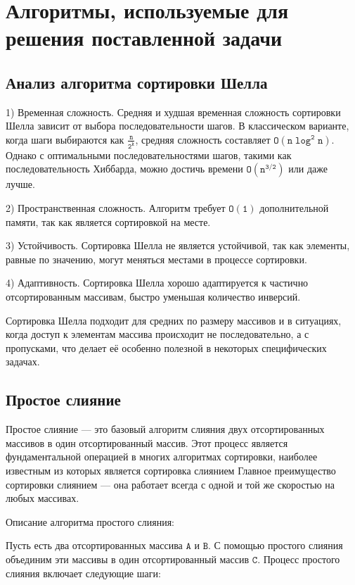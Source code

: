 \documentclass[]{article}
\theoremstyle{remark}
\theoremstyle{definition}
\newcommand{\term}[1]{$\mathtt{#1}$}
\begin{document}
\newpage
\section{Алгоритмы, используемые для решения поставленной задачи}
\subsection{Анализ алгоритма сортировки Шелла}

\par 1) Временная сложность. Средняя и худшая временная сложность сортировки Шелла зависит от выбора последовательности шагов. В классическом варианте, когда шаги выбираются как \term{\frac{n}{2^k}}, средняя сложность составляет \term{O(n \log^2 n)}. Однако с оптимальными последовательностями шагов, такими как последовательность Хиббарда, можно достичь времени \term{O(n^{3/2})} или даже лучше.
\par 2) Пространственная сложность. Алгоритм требует \term{O(1)} дополнительной памяти, так как является сортировкой на месте.
\par 3) Устойчивость. Сортировка Шелла не является устойчивой, так как элементы, равные по значению, могут меняться местами в процессе сортировки.
\par 4) Адаптивность. Сортировка Шелла хорошо адаптируется к частично отсортированным массивам, быстро уменьшая количество инверсий.

\par Сортировка Шелла подходит для средних по размеру массивов и в ситуациях, когда доступ к элементам массива происходит не последовательно, а с пропусками, что делает её особенно полезной в некоторых специфических задачах.

\subsection{Простое слияние}

\par Простое слияние  — это базовый алгоритм слияния двух отсортированных массивов в один отсортированный массив. Этот процесс является фундаментальной операцией в многих алгоритмах сортировки, наиболее известным из которых является сортировка слиянием Главное преимущество сортировки слиянием — она работает всегда с одной и той же скоростью на любых массивах.

\par Описание алгоритма простого слияния:

\par Пусть есть два отсортированных массива \term{A} и \term{B}. С помощью простого слияния объединим эти массивы в один отсортированный массив \term{C}. Процесс простого слияния включает следующие шаги:
\end{document}
